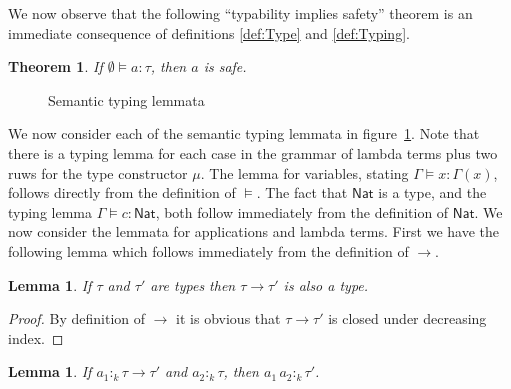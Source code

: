 \documentclass[12pt,a4paper,draft]{article}
\theoremstyle{definition}
\theoremstyle{plain}
\newtheorem{lemma}[definition]{Lemma}
\newtheorem{theorem}[definition]{Theorem}
\newcommand{\abstr}[2]{\ensuremath{\lambda{#1}.\,{#2}}}
\newcommand{\app}[2]{\ensuremath{{#1}\,{#2}}}
\newcommand{\Nat}{\ensuremath{\mathsf{Nat}}}
\begin{document}
We now observe that the following ``typability implies safety'' theorem is an immediate
consequence of definitions \ref{def:Type} and \ref{def:Typing}.
\begin{theorem}
  If $\emptyset \models a : \tau$, then $a$ is safe.
\end{theorem}

\begin{figure}[htb]
  \centering
  \caption{Semantic typing lemmata}
  \label{fig:Semantic_typing_lemmata}
\end{figure}

We now consider each of the semantic typing lemmata in figure~\ref{fig:Semantic_typing_lemmata}.
Note that there is a typing lemma for each case in the grammar of lambda terms plus two ruws
for the type constructor $\mu$. The lemma for variables, stating $\Gamma \models x : \Gamma(x)$,
follows directly from the definition of $\models$. The fact that $\Nat$ is a type, and the
typing lemma $\Gamma \models c : \Nat$, both follow immediately from the definition of $\Nat$.
We now consider the lemmata for applications and lambda terms. First we have the following
lemma which follows immediately from the definition of $\to$.
\begin{lemma}
  If $\tau$ and $\tau'$ are types then $\tau \to \tau'$ is also a type.
\end{lemma}

\begin{proof}
  By definition of $\to$ it is obvious that $\tau \to \tau'$ is closed
  under decreasing index.
\end{proof}

\begin{lemma} \label{lem:Application}
  If $a_1 :_k \tau \to \tau'$ and $a_2 :_k \tau$, then $\app{a_1}{a_2} :_k \tau'$.
\end{lemma}
\end{document}
